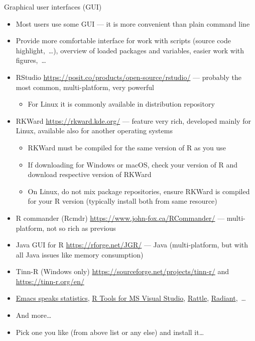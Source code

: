 \documentclass[compress, xelatex, 11pt, xcolor=svgnames, aspectratio=169,
	hyperref={
		bookmarks=true,
		unicode=true,
		colorlinks=true,
		pdftitle={Molecular data in R},
		plainpages=false,
		pdfauthor={Vojtech Zeisek},
		pdfsubject={Course about phylogeny and evolution in R},
		pdfcreator={XeLaTeX},
		pdfkeywords={R, evolution, phylogeny, molecular data},
		linkcolor=Crimson, %
		anchorcolor=Magenta, %
		citecolor=Magenta, %
		filecolor=Magenta, %
		menucolor=Magenta, %
		urlcolor=DodgerBlue, %
		},
	url={hyphens, lowtilde} %
	]{beamer}
\begin{document}
\begin{frame}[allowframebreaks]{Graphical user interfaces (GUI)}
	\label{gui}
	\begin{itemize}
		\item Most users use some GUI --- it is more convenient than plain command line
		\item Provide more comfortable interface for work with scripts (source code highlight,~\ldots), overview of loaded packages and variables, easier work with figures,~\ldots
		\item RStudio \url{https://posit.co/products/open-source/rstudio/} --- probably the most common, multi-platform, very powerful
		\begin{itemize}
		 \item For Linux it is commonly available in distribution repository
		\end{itemize}
		\item RKWard \url{https://rkward.kde.org/} --- feature very rich, developed mainly for Linux, available also for another operating systems
		\begin{itemize}
			\item RKWard must be compiled for the same version of R as you use
			\item If downloading for Windows or macOS, check your version of R and download respective version of RKWard
			\item On Linux, do not mix package repositories, ensure RKWard is compiled for your R version (typically install both from same resource)
		\end{itemize}
		\item R commander (Rcmdr) \url{https://www.john-fox.ca/RCommander/} --- multi-platform, not so rich as previous
		\item Java GUI for R \url{https://rforge.net/JGR/} --- Java (multi-platform, but with all Java issues like memory consumption)
		\item Tinn-R (Windows only) \url{https://sourceforge.net/projects/tinn-r/} and \url{https://tinn-r.org/en/}
		\item \href{https://ess.r-project.org/}{Emacs speaks statistics}, \href{https://code.visualstudio.com/docs/languages/r}{R Tools for MS Visual Studio}, \href{https://rattle.togaware.com/}{Rattle}, \href{https://radiant-rstats.github.io/docs/}{Radiant},~\ldots
		\item And more\ldots
		\item Pick one you like (from above list or any else) and install it\ldots
	\end{itemize}
\end{frame}
\end{document}
